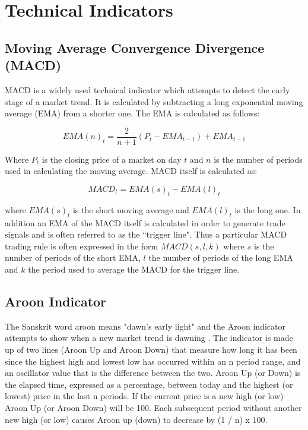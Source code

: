 
\chapter{Technical Indicators} %

\label{AppendixB} %



\section{Moving Average Convergence Divergence (MACD)}
\label{appB:MACD}
MACD is a widely used technical indicator which attempts to detect the early stage of a market trend. It is calculated by subtracting a long exponential moving average (EMA) from a shorter one. The EMA is calculated as follows:

\[ EMA(n)_{t} = \dfrac{2}{n+1}(P_{t}-EMA_{t-1}) + EMA_{t-1}\]

Where $ P_{t} $ is the closing price of a market on day $ t $ and $ n $ is the number of periods used in calculating the moving average. MACD itself is calculated as:

\[ MACD_{t} = EMA(s)_{t} - EMA(l)_{t} \]

where $ EMA(s)_{t} $ is the short moving average and $ EMA(l)_{t} $ is the long one. In addition an EMA of the MACD itself is calculated in order to generate trade signals and is often referred to as the \textquotedblleft trigger line". Thus a particular MACD trading rule is often expressed in the form $ MACD(s,l,k) $ where $ s $ is the number of periods of the short EMA, $ l $ the number of periods of the long EMA and $ k $ the period used to average the MACD for the trigger line.

\section{Aroon Indicator}
\label{appB:aroon}
The Sanskrit word aroon means "dawn's early light" and the Aroon indicator attempts to show when a new market trend is dawning \citep{chande1994new}. The indicator is made up of two lines (Aroon Up and Aroon Down) that measure how long it has been since the highest high and lowest low has occurred within an n period range, and an oscillator value that is the difference between the two. Aroon Up (or Down) is the elapsed time, expressed as a percentage, between today and the highest (or lowest) price in the last n periods. If the current price is a new high (or low) Aroon Up (or Aroon Down) will be 100. Each subsequent period without another new high (or low) causes Aroon up (down) to decrease by (1 / n) x 100.

